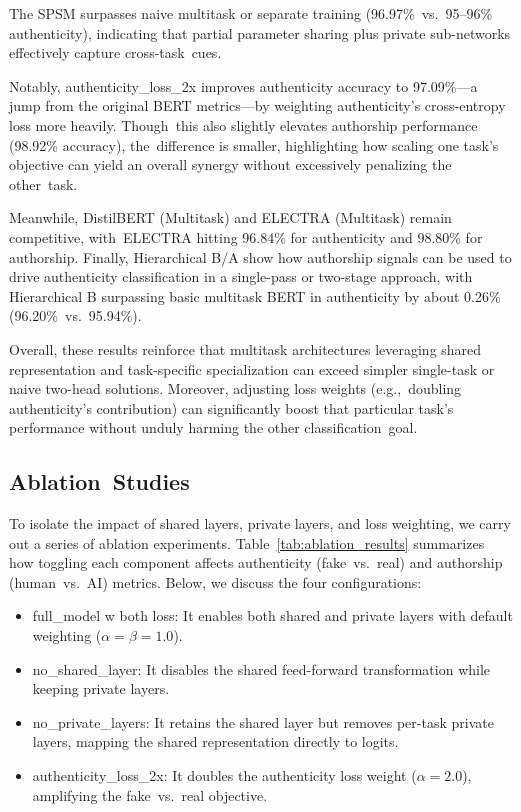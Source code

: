 \documentclass[electronics,article,accept,pdftex,moreauthors,electronics]{Definitions/mdpi}
\begin{document}

The SPSM surpasses naive multitask or separate training (96.97\%~vs.~95--96\% authenticity), indicating that partial parameter sharing plus private sub-networks effectively capture cross-task~cues. 

Notably, authenticity\_loss\_2x improves authenticity accuracy to 97.09\%---a jump from the original BERT metrics---by weighting authenticity’s cross-entropy loss more heavily. Though~this also slightly elevates authorship performance (98.92\% accuracy), the~difference is smaller, highlighting how scaling one task’s objective can yield an overall synergy without excessively penalizing the other~task. 

Meanwhile, DistilBERT (Multitask) and ELECTRA (Multitask) remain competitive, with~ELECTRA hitting 96.84\% for authenticity and 98.80\% for authorship. Finally, Hierarchical B/A show how authorship signals can be used to drive authenticity classification in a single-pass or two-stage approach, with Hierarchical B surpassing basic multitask BERT in authenticity by about 0.26\% (96.20\%~vs.~95.94\%). 

Overall, these results reinforce that multitask architectures leveraging shared representation and task-specific specialization can exceed simpler single-task or naive two-head solutions. Moreover, adjusting loss weights (e.g.,~doubling authenticity’s contribution) can significantly boost that particular task’s performance without unduly harming the other classification~goal.


\subsection{Ablation~Studies}
\label{sec:res_ablation}

To isolate the impact of shared layers, private layers, and loss weighting, we carry out a series of ablation experiments. Table~\ref{tab:ablation_results} summarizes how toggling each component affects authenticity (fake~vs.~real) and authorship (human~vs.~AI) metrics. Below, we discuss the four configurations:

\begin{itemize}
    \item full\_model w both loss: It enables both shared and private layers with default weighting (\(\alpha = \beta = 1.0\)).
    \item no\_shared\_layer: It disables the shared feed-forward transformation while keeping private layers.
    \item no\_private\_layers: It retains the shared layer but removes per-task private layers, mapping the shared representation directly to logits.
    \item authenticity\_loss\_2x: It doubles the authenticity loss weight (\(\alpha=2.0\)), amplifying the fake~vs.~real objective.
\end{itemize}
\end{document}
